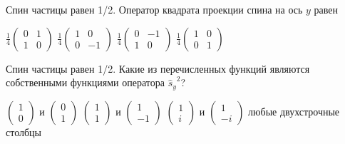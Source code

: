 \documentclass[11pt,a4paper]{exam}
\begin{document}
\begin{questions}
\question Спин частицы равен 1/2. Оператор квадрата проекции спина на ось $y$ равен
\begin{choices}
\choice $\frac{1}{4}\left( {\begin{array}{*{20}{c}}
0&1\\
1&0
\end{array}} \right)$      
\choice $\frac{1}{4}\left( {\begin{array}{*{20}{c}}
1&0\\
0&{ - 1}
\end{array}} \right)$      
\choice $\frac{1}{4}\left( {\begin{array}{*{20}{c}}
0&{ - 1}\\
1&0
\end{array}} \right)$      
\choice $\frac{1}{4}\left( {\begin{array}{*{20}{c}}
1&0\\
0&1
\end{array}} \right)$
\end{choices}

\question Спин частицы равен 1/2. Какие из перечисленных функций являются собственными функциями оператора ${\hat s_y}^2$?
\begin{choices}
\choice $\left( {\begin{array}{*{20}{c}}
1\\
0
\end{array}} \right)$ и $\left( {\begin{array}{*{20}{c}}
0\\
1
\end{array}} \right)$      
\choice $\left( {\begin{array}{*{20}{c}}
1\\
1
\end{array}} \right)$ и $\left( {\begin{array}{*{20}{c}}
1\\
{ - 1}
\end{array}} \right)$      
\choice $\left( {\begin{array}{*{20}{c}}
1\\
i
\end{array}} \right)$ и $\left( {\begin{array}{*{20}{c}}
1\\
{ - i}
\end{array}} \right)$      
\choice любые двухстрочные столбцы
\end{choices}


\end{questions}
\end{document}
